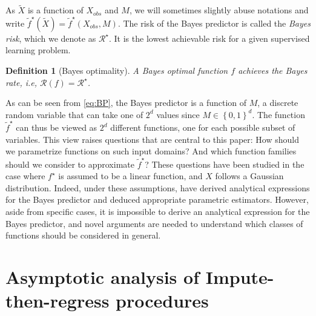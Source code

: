 \documentclass{article}
\newcommand{\Rcal}{\mathcal{R}}
\newcommand{\cbr}[1]{\left\{#1\right\}}
\theoremstyle{plain}
\newtheorem{definition}{Definition}
\begin{document}
As $\widetilde X$ is a function of $X_{obs}$ and $M$, we will sometimes slightly abuse notations and write $\tilde f^\star(\widetilde X) = \tilde f^\star(X_{obs}, M)$. The risk of the Bayes predictor is called the \emph{Bayes risk}, which we denote as $\Rcal^{\star}$. It is the lowest achievable risk for a given supervised learning problem.

\begin{definition}[Bayes optimality]
A \emph{Bayes optimal} function $f$ achieves the Bayes rate, i.e, $\Rcal(f) = \Rcal^{\star}$.
\end{definition}




As can be seen from \eqref{eq:BP}, the Bayes predictor is a function of $M$, a discrete random variable that can take one of $2^d$ values since $M \in \cbr{0, 1}^d$. The function  $\tilde{f}^{\star}$ can thus be viewed as $2^d$ different functions, one for each possible subset of variables. This view raises questions that are central to this paper: How should we parametrize functions on such input domains? And which function families should we consider to approximate $\tilde{f}^{\star}$? These questions have been studied in the case where $f^\star$ is assumed to be a linear function, and $X$ follows a Gaussian distribution. Indeed, under these assumptions, \citet{LeMorvan2020Linear,LeMorvan2020NeuMiss} have derived analytical expressions for the Bayes predictor and deduced appropriate parametric estimators. However, aside from specific cases, it is impossible to derive an analytical expression for the Bayes predictor, and novel arguments are needed to understand which classes of functions should be considered in general.

\section{Asymptotic analysis of Impute-then-regress procedures}
\end{document}
